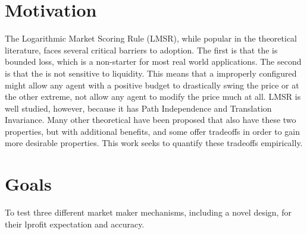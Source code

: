 \section{Motivation}
The Logarithmic Market Scoring Rule (LMSR), while popular in the theoretical
literature, faces several critical barriers to adoption. The first is that
the  is bounded loss, which is a non-starter for most
real world applications. The second is that the  is not
sensitive to liquidity. This means that a improperly configured 
might allow any agent with a positive budget to drastically swing the price or at
the other extreme, not allow any agent to modify the price much at all. LMSR is
well studied, however, because it has Path Independence and Translation Invariance.
Many other theoretical  have been proposed that also have
these two properties, but with additional benefits, and some offer tradeoffs in
order to gain more desirable properties. This work seeks to quantify these
tradeoffs empirically.

\section{Goals}
To test three different market maker mechanisms, including a novel design, for their lprofit expectation and accuracy. 
